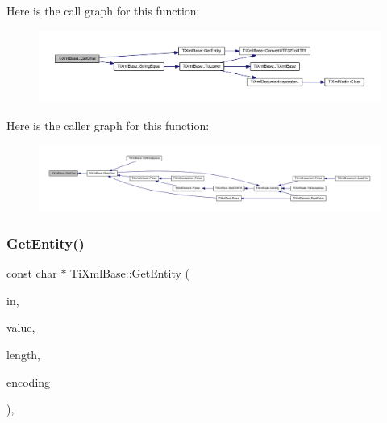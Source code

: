 Here is the call graph for this function\+:
\nopagebreak
\begin{figure}[H]
\begin{center}
\leavevmode
\includegraphics[width=350pt]{class_ti_xml_base_a5b0fde72d6f662ae1fd6303195d2159b_cgraph}
\end{center}
\end{figure}
Here is the caller graph for this function\+:
\nopagebreak
\begin{figure}[H]
\begin{center}
\leavevmode
\includegraphics[width=350pt]{class_ti_xml_base_a5b0fde72d6f662ae1fd6303195d2159b_icgraph}
\end{center}
\end{figure}
\mbox{\label{class_ti_xml_base_ac5c08bf3deffcda0bf8ce2958372b584}} 
\subsubsection{\texorpdfstring{Get\+Entity()}{GetEntity()}}
{\footnotesize\ttfamily const char $\ast$ Ti\+Xml\+Base\+::\+Get\+Entity (\begin{DoxyParamCaption}\item[{const char $\ast$}]{in,  }\item[{char $\ast$}]{value,  }\item[{int $\ast$}]{length,  }\item[{\hyperlink{tinyxml_8h_a88d51847a13ee0f4b4d320d03d2c4d96}{Ti\+Xml\+Encoding}}]{encoding }\end{DoxyParamCaption})\hspace{0.3cm}{\ttfamily [static]}, {\ttfamily [protected]}}

